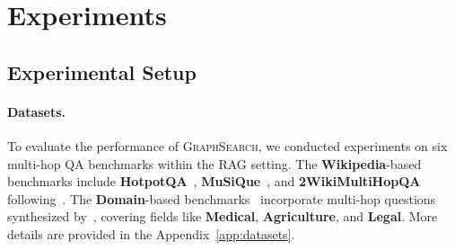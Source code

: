 \section{Experiments}
\subsection{Experimental Setup}
\paragraph{Datasets.} 
To evaluate the performance of \textsc{GraphSearch}, we conducted experiments on six multi-hop QA benchmarks within the RAG setting. The \textbf{Wikipedia}-based benchmarks include \textbf{HotpotQA}~\citep{hotpotqa}, \textbf{MuSiQue}~\citep{musique}, and \textbf{2WikiMultiHopQA}~\citep{2wiki} following~\citep{hipporag2, longfaith}. The \textbf{Domain}-based benchmarks~\citep{ultradomain} incorporate multi-hop questions synthesized by~\citep{hypergraphrag}, covering fields like \textbf{Medical}, \textbf{Agriculture}, and \textbf{Legal}. More details are provided in the Appendix~\ref{app:datasets}.

